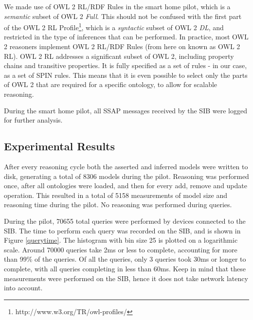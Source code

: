 
We made use of OWL 2 RL/RDF Rules in the smart home pilot, which is a \emph{semantic} subset of OWL 2 \emph{Full}. This should not be confused with the first part of the OWL 2 RL Profile\footnote{http://www.w3.org/TR/owl-profiles/}, which is a \emph{syntactic} subset of OWL 2 \emph{DL}, and restricted in the type of inferences that can be performed. In practice, most OWL 2 reasoners implement OWL 2 RL/RDF Rules (from here on known as OWL 2 RL). OWL 2 RL addresses a significant subset of OWL 2, including property chains and transitive properties. It is fully specified as a set of rules - in our case, as a set of \ac{SPIN} rules. This means that it is even possible to select only the parts of OWL 2 that are required for a specific ontology, to allow for scalable reasoning.

During the smart home pilot, all \ac{SSAP} messages received by the \ac{SIB} were logged for further analysis.

\subsection{Experimental Results}
\label{results}

After every reasoning cycle both the asserted and inferred models were written to disk, generating a total of 8306 models during the pilot. Reasoning was performed once, after all ontologies were loaded, and then for every add, remove and update operation. This resulted in a total of 5158 measurements of model size and reasoning time during the pilot. No reasoning was performed during queries.

During the pilot, 70655 total queries were performed by devices connected to the SIB. The time to perform each query was recorded on the SIB, and is shown in Figure \ref{querytime}. The histogram with bin size 25 is plotted on a logarithmic scale. Around 70000 queries take 2ms or less to complete, accounting for more than 99\% of the queries. Of all the queries, only 3 queries took 30ms or longer to complete, with all queries completing in less than 60ms. Keep in mind that these measurements were performed on the SIB, hence it does not take network latency into account.

